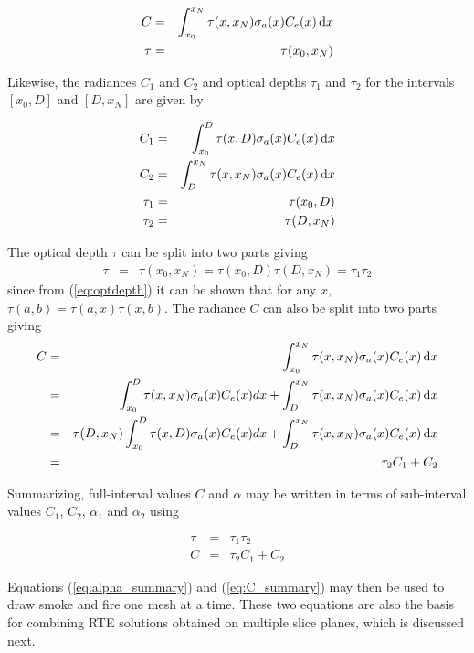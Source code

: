 {\begin{eqnarray}
C&=&\int_{x_0}^{x_N}\tau(x,x_N)\sigma_a(x)C_e(x)\,\mbox{d}x\\
\tau&=&\tau(x_0,x_N)
\end{eqnarray}

Likewise, the radiances $C_1$ and $C_2$ and optical depths
$\tau_1$ and $\tau_2$ for the intervals $[x_0,D]$ and $[D,x_N]$
are given by

\begin{eqnarray}
C_1&=&\int_{x_0}^{D}\tau(x,D)\sigma_a(x)C_e(x)\,\mbox{d}x\\
C_2&=&\int_{D}^{x_N}\tau(x,x_N)\sigma_a(x)C_e(x)\,\mbox{d}x\\
\tau_1&=&\tau(x_0,D)\\
\tau_2&=&\tau(D,x_N)
\end{eqnarray}

The optical depth $\tau$ can be split into two parts giving
\begin{eqnarray}
\tau&=&\tau(x_0,x_N)=\tau(x_0,D)\tau(D,x_N)=\tau_1\tau_2
\end{eqnarray}
since from (\ref{eq:optdepth}) it can be shown that for any $x$, $\tau(a,b)=\tau(a,x)\tau(x,b)$.
The radiance $C$ can also be split into two parts giving
\begin{eqnarray}
C&=&\int_{x_0}^{x_N}\tau(x,x_N)\sigma_a(x)C_e(x)\,\mbox{d}x\\
&=&\int_{x_0}^{D}\tau(x,x_N)\sigma_a(x)C_e(x)dx+\int_{D}^{x_N}\tau(x,x_N)\sigma_a(x)C_e(x)\,\mbox{d}x\\
&=&\tau(D,x_N)\int_{x_0}^{D}\tau(x,D)\sigma_a(x)C_e(x)dx+\int_{D}^{x_N}\tau(x,x_N)\sigma_a(x)C_e(x)\,\mbox{d}x\\
&=&\tau_2C_1+C_2
\end{eqnarray}

Summarizing, full-interval values $C$ and $\alpha$ may be written
in terms of sub-interval values $C_1$, $C_2$, $\alpha_1$ and
$\alpha_2$ using

\begin{eqnarray}
\label{eq:alpha_summary}
\tau&=&\tau_1\tau_2\\
\label{eq:C_summary}
C&=&\tau_2C_1+C_2
\end{eqnarray}

Equations (\ref{eq:alpha_summary}) and (\ref{eq:C_summary}) may
then be used to draw smoke and fire one mesh at a time.  These two
equations are also the basis for combining RTE solutions obtained
on multiple slice planes, which is discussed next.


}
